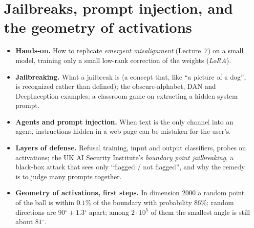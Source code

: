\chapter{Jailbreaks, prompt injection, and the geometry of activations}\label{ch:L8}
\newcommand{\eightdeg}{\ensuremath{^{\circ}}}%

\begin{glance}
\begin{itemize}
  \item \textbf{Hands-on.} How to replicate \emph{emergent misalignment} (Lecture~7) on a small model, training only a small low-rank correction of the weights (\emph{LoRA}).
  \item \textbf{Jailbreaking.} What a jailbreak is (a concept that, like ``a picture of a dog'', is recognized rather than defined); the obscure-alphabet, DAN and DeepInception examples; a classroom game on extracting a hidden system prompt.
  \item \textbf{Agents and prompt injection.} When text is the only channel into an agent, instructions hidden in a web page can be mistaken for the user's.
  \item \textbf{Layers of defense.} Refusal training, input and output classifiers, probes on activations; the UK AI Security Institute's \emph{boundary point jailbreaking}, a black-box attack that sees only ``flagged / not flagged'', and why the remedy is to judge many prompts together.
  \item \textbf{Geometry of activations, first steps.} In dimension $2000$ a random point of the ball is within $0.1\%$ of the boundary with probability $86\%$; random directions are $90\eightdeg\pm1.3\eightdeg$ apart; among $2\cdot10^{5}$ of them the smallest angle is still about $81\eightdeg$.
\end{itemize}
\end{glance}

